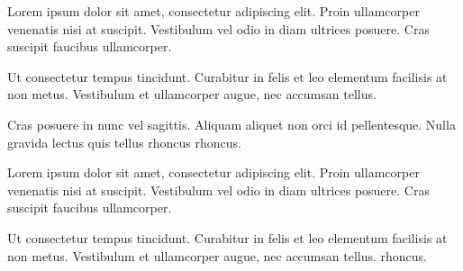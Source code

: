 \documentclass[]{plushcv}
\begin{document}
\begin{minipage}[t]{0.70\textwidth}
\vspace{\topsep} %
\minibreak %

\begin{tightemize}
\sectionsep
\item Lorem ipsum dolor sit amet, consectetur adipiscing elit. Proin ullamcorper venenatis nisi at suscipit. Vestibulum vel odio in diam ultrices posuere. Cras suscipit faucibus ullamcorper.
\item Ut consectetur tempus tincidunt. Curabitur in felis et leo elementum facilisis at non metus. Vestibulum et ullamcorper augue, nec accumsan tellus.
\item Cras posuere in nunc vel sagittis. Aliquam aliquet non orci id pellentesque. Nulla gravida lectus quis tellus rhoncus rhoncus.
\end{tightemize}
\sectionsep

\begin{tightemize}
\sectionsep
\item Lorem ipsum dolor sit amet, consectetur adipiscing elit. Proin ullamcorper venenatis nisi at suscipit. Vestibulum vel odio in diam ultrices posuere. Cras suscipit faucibus ullamcorper.
\item Ut consectetur tempus tincidunt. Curabitur in felis et leo elementum facilisis at non metus. Vestibulum et ullamcorper augue, nec accumsan tellus.
 rhoncus.
\end{tightemize}
\sectionsep





%
%

\end{minipage} 
\end{document}
